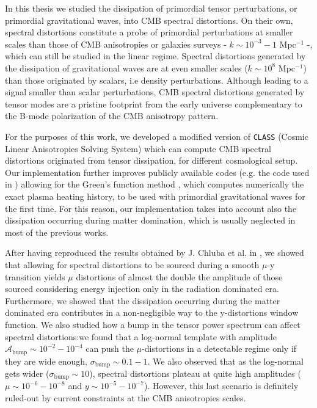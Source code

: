 In this thesis we studied the dissipation of primordial tensor perturbations, or primordial gravitational waves, into CMB spectral distortions. On their own, spectral distortions constitute a probe of primordial perturbations at smaller scales than those of CMB anisotropies or galaxies surveys - $k\sim10^{-3} - 1$ Mpc$^{-1}$ -, which can still be studied in the linear regime. Spectral distortions generated by the dissipation of gravitational waves are at even smaller scales ($k\sim10^{8}$ Mpc$^{-1}$) than those originated by scalars, i.e density perturbations. Although leading to a signal smaller than scalar perturbations, CMB spectral distortions generated by tensor modes are a pristine footprint from the early universe complementary to the B-mode polarization of the CMB anisotropy pattern.

For the purposes of this work, we developed a modified version of \texttt{CLASS} (Cosmic Linear Anisotropies Solving System) which can compute CMB spectral distortions originated from tensor dissipation, for different cosmological setup. Our implementation further improves publicly available codes (e.g. the code used in \cite{Kite_2021}) allowing for the Green's function method \cite{Chluba_Green}, which computes numerically the exact plasma heating history, to be used with primordial gravitational waves for the first time. For this reason, our implementation takes into account also the dissipation occurring during matter domination, which is usually neglected in most of the previous works.

After having reproduced the results obtained by J. Chluba et al. in \cite{Chluba_tens_diss}, we showed that allowing for spectral distortions to be sourced during a smooth $\mu$-y transition yields $\mu$ distortions of almost the double the amplitude of those sourced considering energy injection only in the radiation dominated era. Furthermore, we showed that the dissipation occurring during the matter dominated era contributes in a non-negligible way to the y-distortions window function. We also studied how a bump in the tensor power spectrum can affect spectral distortions:we found that a log-normal template with amplitude $\mathcal A_\text{bump}\sim10^{-2}-10^{-4}$ can push the $\mu$-distortions in a detectable regime only if they are wide enough, $\sigma_\text{bump}\sim 0.1-1$. We also observed that as the log-normal gets wider ($\sigma_\text{bump}\sim10$), spectral distortions plateau at quite high amplitudes ($\mu\sim10^{-6}-10^{-8}$ and $y\sim10^{-5}-10^{-7}$). However, this last scenario is definitely ruled-out by current constraints at the CMB anisotropies scales.

